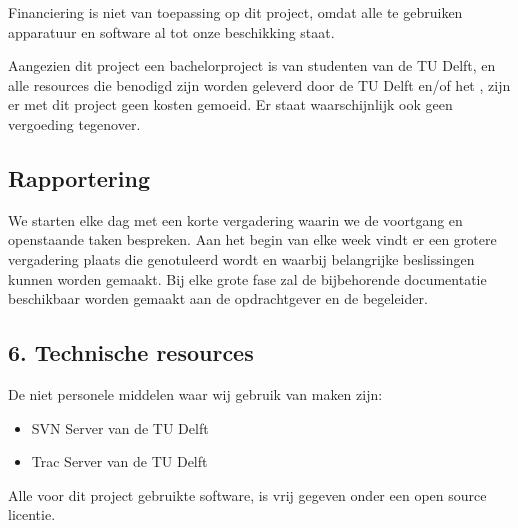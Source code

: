 Financiering is niet van toepassing op dit project, omdat alle te gebruiken apparatuur en software al tot onze beschikking staat.

Aangezien dit project een bachelorproject is van studenten van de TU Delft, en alle resources die benodigd zijn worden geleverd door de TU Delft en/of het \casamproject, zijn er met dit project geen kosten gemoeid. Er staat waarschijnlijk ook geen vergoeding tegenover.

\subsection{Rapportering}

We starten elke dag met een korte vergadering waarin we de voortgang en openstaande taken bespreken. Aan het begin van elke week vindt er een grotere vergadering plaats die genotuleerd wordt en waarbij belangrijke beslissingen kunnen worden gemaakt. Bij elke grote fase zal de bijbehorende documentatie beschikbaar worden gemaakt aan de opdrachtgever en de begeleider.

\subsection{6.	Technische resources}

De niet personele middelen waar wij gebruik van maken zijn:
\begin{itemize}
	\item SVN Server van de TU Delft
	\item Trac Server van de TU Delft
\end{itemize}
Alle voor dit project gebruikte software, is vrij gegeven onder een open source licentie.
